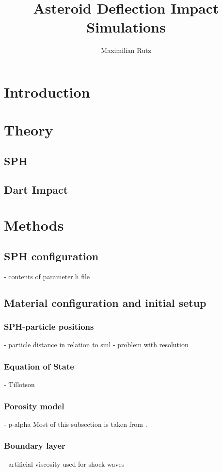 \documentclass{article}
\title{Asteroid Deflection Impact Simulations}
\author{Maximilian Rutz}
\date{}
\begin{document}
\maketitle
\begin{abstract}

\end{abstract}

\newpage
\tableofcontents

\newpage
\section{Introduction}
\section{Theory}
\subsection{SPH}
\subsection{Dart Impact}
\section{Methods}
\subsection{SPH configuration}
- contents of parameter.h file
\subsection{Material configuration and initial setup}
\subsubsection{SPH-particle positions}
- particle distance in relation to sml
- problem with resolution
\subsubsection{Equation of State}
- Tillotson
\subsubsection{Porosity model}
- p-alpha
Most of this subsection is taken from \cite{Jutzi_p_alpha_1}.
\subsubsection{Boundary layer}
- artificial viscosity used for shock waves
\end{document}
